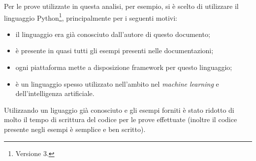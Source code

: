 %
Per le prove utilizzate in questa analisi, per esempio, si è scelto di utilizzare il linguaggio Python\footnote{Versione 3.},
principalmente per i seguenti motivi:
\begin{itemize}
	\item il linguaggio era già conosciuto dall'autore di questo documento;
	\item è presente in quasi tutti gli esempi presenti nelle documentazioni;
	\item ogni piattaforma mette a disposizione framework per questo linguaggio;
	\item è un linguaggio spesso utilizzato nell'ambito nel \textit{machine learning} e dell'intelligenza artificiale.
\end{itemize}
Utilizzando un liguaggio già conosciuto e gli esempi forniti è stato ridotto di molto il tempo di scrittura del codice per le prove effettuate
(inoltre il codice presente negli esempi è semplice e ben scritto).




%
